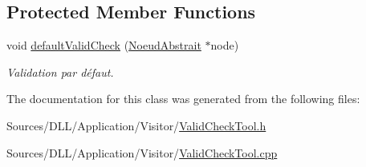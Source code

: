 \subsection*{Protected Member Functions}
\begin{DoxyCompactItemize}
\item 
\hypertarget{group__inf2990_ga58a361b0ca91a2b7acb338d39bc0172a}{}void \hyperlink{group__inf2990_ga58a361b0ca91a2b7acb338d39bc0172a}{default\+Valid\+Check} (\hyperlink{class_noeud_abstrait}{Noeud\+Abstrait} $\ast$node)\label{group__inf2990_ga58a361b0ca91a2b7acb338d39bc0172a}

\begin{DoxyCompactList}\small\item\em Validation par défaut. \end{DoxyCompactList}\end{DoxyCompactItemize}


The documentation for this class was generated from the following files\+:\begin{DoxyCompactItemize}
\item 
Sources/\+D\+L\+L/\+Application/\+Visitor/\hyperlink{_valid_check_tool_8h}{Valid\+Check\+Tool.\+h}\item 
Sources/\+D\+L\+L/\+Application/\+Visitor/\hyperlink{_valid_check_tool_8cpp}{Valid\+Check\+Tool.\+cpp}\end{DoxyCompactItemize}
